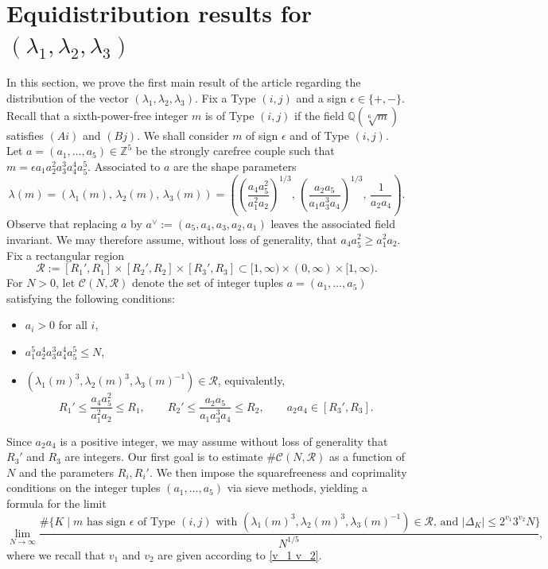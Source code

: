 \documentclass[table]{amsart}
\newcommand{\Q}{\mathbb{Q}}
\numberwithin{equation}{section}
\begin{document}
\section{Equidistribution results for \texorpdfstring{$(\lambda_1, \lambda_2, \lambda_3)$}{(lambda1, lambda2, lambda3)}}\label{s 4}
\par
In this section, we prove the first main result of the article regarding the distribution of the vector $(\lambda_1, \lambda_2, \lambda_3)$. Fix a Type $(i,j)$ and a sign $\epsilon\in\{+,-\}$. Recall that a sixth-power-free integer $m$ is of Type $(i,j)$ if the field $\Q(\sqrt[6]{m})$ satisfies $(Ai)$ and $(Bj)$. We shall consider $m$ of sign $\epsilon$ and of Type $(i,j)$. Let $a=(a_1,\dots,a_5)\in\mathbb{Z}^5$ be the strongly carefree couple such that $m=\epsilon a_1 a_2^2 a_3^3 a_4^4 a_5^5$. Associated to $a$ are the shape parameters
\[
\lambda(m)=(\lambda_1(m),\,\lambda_2(m),\,\lambda_3(m))
=
\left(
\left(\frac{a_4 a_5^2}{a_1^2 a_2}\right)^{1/3},\,
\left(\frac{a_2 a_5}{a_1 a_3^3 a_4}\right)^{1/3},\,
\frac{1}{a_2 a_4}
\right).
\]
\noindent Observe that replacing $a$ by $a^\vee := (a_5,a_4,a_3,a_2,a_1)$ leaves the
associated field invariant. We may therefore
assume, without loss of generality, that $a_4a_5^2\geq a_1^2a_2$. Fix a rectangular region
\[
\mathscr{R}:=[R_1',R_1]\times [R_2',R_2]\times [R_3',R_3]
\subset
[1, \infty)\times (0,\infty)\times [1,\infty).
\]
For $N>0$, let
$\mathcal{C}(N,\mathscr{R})$
denote the set of integer tuples $a=(a_1,\dots,a_5)$ satisfying the following conditions:
\begin{itemize}
    \item $a_i>0$ for all $i$,
    \item $a_1^5 a_2^4 a_3^3 a_4^4 a_5^5 \le N$,
    \item $(\lambda_1(m)^3, \lambda_2(m)^3, \lambda_3(m)^{-1})\in\mathscr{R}$, equivalently,
    \[
    R_1'\le \frac{a_4 a_5^2}{a_1^2 a_2}\le R_1,\qquad
    R_2'\le \frac{a_2 a_5}{a_1 a_3^3 a_4}\le R_2,\qquad
    a_2 a_4 \in [R_3',R_3].
    \]
\end{itemize}
Since $a_2 a_4$ is a positive integer, we may assume without loss of
generality that $R_3'$ and $R_3$ are integers. Our first goal is to estimate
$\#\mathcal{C}(N,\mathscr{R})$ as a function of $N$ and the
parameters $R_i,R_i'$. We then impose the squarefreeness and coprimality
conditions on the integer tuples $(a_1,\dots, a_5)$ via sieve methods, yielding a formula for the limit
\[\lim_{N\rightarrow \infty} \frac{\#\{K\mid m\text{ has sign }\epsilon \text{ of Type }(i,j)\text{ with }(\lambda_1(m)^3, \lambda_2(m)^3, \lambda_3(m)^{-1})\in \mathscr{R}\text{, and }|\Delta_K|\leq 2^{v_1}3^{v_2}N\}}{N^{1/5}},\] where we recall that $v_1$ and $v_2$ are given according to \eqref{v_1 v_2}.
\end{document}
